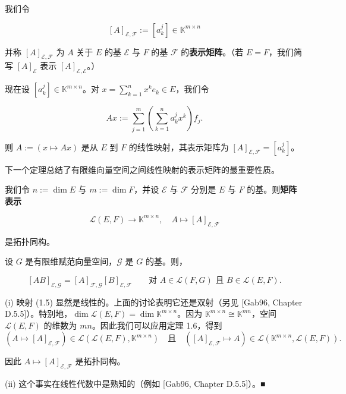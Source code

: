 我们令

\[
[A]_{\mathcal{E},\mathcal{F}} := [a_{k}^{j}] \in \mathbb{K}^{m \times n}
\]

并称 $ [A]_{\mathcal{E},\mathcal{F}} $ 为 $ A $ 关于 $ E $ 的基 $ \mathcal{E} $ 与 $ F $ 的基 $ \mathcal{F} $ 的\textbf{表示矩阵}。（若 $ E = F $，我们简写 $ [A]_{\mathcal{E}} $ 表示 $ [A]_{\mathcal{E},\mathcal{E}} $。）

现在设 $ [a_{k}^{j}] \in \mathbb{K}^{m \times n} $。对 $ x = \sum_{k=1}^{n} x^{k}e_{k} \in E $，我们令

\[
Ax := \sum_{j=1}^{m}\left( \sum_{k=1}^{n} a_{k}^{j}x^{k} \right)f_{j} .
\]

则 $ A := (x \mapsto Ax) $ 是从 $ E $ 到 $ F $ 的线性映射，其表示矩阵为 $ [A]_{\mathcal{E},\mathcal{F}} = [a_{k}^{j}] $。

下一个定理总结了有限维向量空间之间线性映射的表示矩阵的最重要性质。

\begin{theorem}

\begin{subitems}
\item

我们令 $ n := \dim E $ 与 $ m := \dim F $，并设 $ \mathcal{E} $ 与 $ \mathcal{F} $ 分别是 $ E $ 与 $ F $ 的基。则\textbf{矩阵表示}

\begin{equation}
\mathcal{L}(E, F) \to \mathbb{K}^{m \times n} , \quad A \mapsto [A]_{\mathcal{E},\mathcal{F}}\tag{1.5}
\end{equation}

是拓扑同构。

\item

设 $ G $ 是有限维赋范向量空间，$ \mathcal{G} $ 是 $ G $ 的基。则，

\[
[AB]_{\mathcal{E},\mathcal{G}} = [A]_{\mathcal{F},\mathcal{G}}[B]_{\mathcal{E},\mathcal{F}} \qquad \text{对 } A \in \mathcal{L}(F, G) \text{ 且 } B \in \mathcal{L}(E, F) .
\]

\proofhead
(i) 映射 (1.5) 显然是线性的。上面的讨论表明它还是双射（另见 [Gab96, Chapter D.5.5]）。特别地，$ \dim \mathcal{L}(E, F) = \dim \mathbb{K}^{m \times n} $。因为 $ \mathbb{K}^{m \times n} \cong \mathbb{K}^{mn} $，空间 $ \mathcal{L}(E, F) $ 的维数为 $ mn $。因此我们可以应用定理 1.6，得到
\[
(A \mapsto [A]_{\mathcal{E},\mathcal{F}}) \in \mathcal{L}(\mathcal{L}(E, F), \mathbb{K}^{m \times n}) \quad \text{且} \quad ([A]_{\mathcal{E},\mathcal{F}} \mapsto A) \in \mathcal{L}(\mathbb{K}^{m \times n}, \mathcal{L}(E, F)) .
\]

因此 $ A \mapsto [A]_{\mathcal{E},\mathcal{F}} $ 是拓扑同构。

\end{subitems}

(ii) 这个事实在线性代数中是熟知的（例如 [Gab96, Chapter D.5.5]）。\nobreak\hspace{0.35em}■

\end{theorem}

